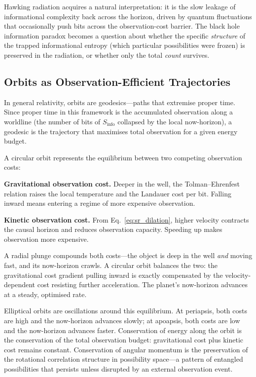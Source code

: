 \documentclass[12pt,a4paper]{article}
\begin{document}
Hawking radiation acquires a natural interpretation: it is the slow leakage of informational complexity back across the horizon, driven by quantum fluctuations that occasionally push bits across the observation-cost barrier. The black hole information paradox becomes a question about whether the specific \emph{structure} of the trapped informational entropy (which particular possibilities were frozen) is preserved in the radiation, or whether only the total \emph{count} survives.

\subsection{Orbits as Observation-Efficient Trajectories}

In general relativity, orbits are geodesics---paths that extremise proper time. Since proper time in this framework is the accumulated observation along a worldline (the number of bits of $S_{\mathrm{info}}$ collapsed by the local now-horizon), a geodesic is the trajectory that maximises total observation for a given energy budget.

A circular orbit represents the equilibrium between two competing observation costs:

\textbf{Gravitational observation cost.} Deeper in the well, the Tolman--Ehrenfest relation raises the local temperature and the Landauer cost per bit. Falling inward means entering a regime of more expensive observation.

\textbf{Kinetic observation cost.} From Eq.~\eqref{eq:sr_dilation}, higher velocity contracts the causal horizon and reduces observation capacity. Speeding up makes observation more expensive.

A radial plunge compounds both costs---the object is deep in the well \emph{and} moving fast, and its now-horizon crawls. A circular orbit balances the two: the gravitational cost gradient pulling inward is exactly compensated by the velocity-dependent cost resisting further acceleration. The planet's now-horizon advances at a steady, optimised rate.

Elliptical orbits are oscillations around this equilibrium. At periapsis, both costs are high and the now-horizon advances slowly; at apoapsis, both costs are low and the now-horizon advances faster. Conservation of energy along the orbit is the conservation of the total observation budget: gravitational cost plus kinetic cost remains constant. Conservation of angular momentum is the preservation of the rotational correlation structure in possibility space---a pattern of entangled possibilities that persists unless disrupted by an external observation event.
\end{document}
